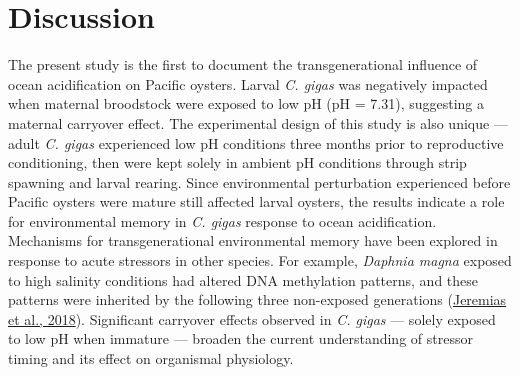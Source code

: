 \documentclass [11pt, proquest] {uwthesis}[2015/03/03]
\begin{document}
\hypertarget{discussion-1}{%
\section{Discussion}\label{discussion-1}}

The present study is the first to document the transgenerational influence of ocean acidification on Pacific oysters. Larval \emph{C. gigas} was negatively impacted when maternal broodstock were exposed to low pH (pH = 7.31), suggesting a maternal carryover effect. The experimental design of this study is also unique --- adult \emph{C. gigas} experienced low pH conditions three months prior to reproductive conditioning, then were kept solely in ambient pH conditions through strip spawning and larval rearing. Since environmental perturbation experienced before Pacific oysters were mature still affected larval oysters, the results indicate a role for environmental memory in \emph{C. gigas} response to ocean acidification. Mechanisms for transgenerational environmental memory have been explored in response to acute stressors in other species. For example, \emph{Daphnia magna} exposed to high salinity conditions had altered DNA methylation patterns, and these patterns were inherited by the following three non-exposed generations (\protect\hyperlink{ref-Jeremias2018}{Jeremias et al., 2018}). Significant carryover effects observed in \emph{C. gigas} --- solely exposed to low pH when immature --- broaden the current understanding of stressor timing and its effect on organismal physiology.
\end{document}
